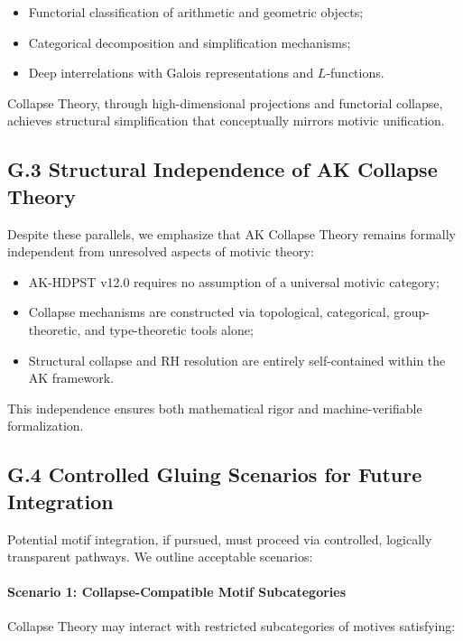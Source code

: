 \documentclass[11pt]{article}
\begin{document}
\begin{itemize}
    \item Functorial classification of arithmetic and geometric objects;
    \item Categorical decomposition and simplification mechanisms;
    \item Deep interrelations with Galois representations and $L$-functions.
\end{itemize}

Collapse Theory, through high-dimensional projections and functorial collapse, achieves structural simplification that conceptually mirrors motivic unification.

\subsection*{G.3 Structural Independence of AK Collapse Theory}

Despite these parallels, we emphasize that AK Collapse Theory remains formally independent from unresolved aspects of motivic theory:

\begin{itemize}
    \item AK-HDPST v12.0 requires no assumption of a universal motivic category;
    \item Collapse mechanisms are constructed via topological, categorical, group-theoretic, and type-theoretic tools alone;
    \item Structural collapse and RH resolution are entirely self-contained within the AK framework.
\end{itemize}

This independence ensures both mathematical rigor and machine-verifiable formalization.

\subsection*{G.4 Controlled Gluing Scenarios for Future Integration}

Potential motif integration, if pursued, must proceed via controlled, logically transparent pathways. We outline acceptable scenarios:

\paragraph{Scenario 1: Collapse-Compatible Motif Subcategories}  
Collapse Theory may interact with restricted subcategories of motives satisfying:
\end{document}
